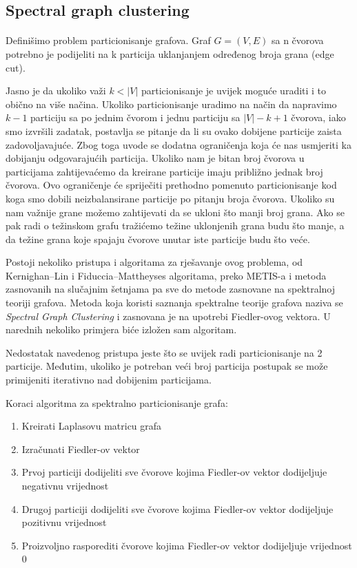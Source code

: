 \documentclass[11pt]{article}
\begin{document}
	\subsection{Spectral graph clustering}
	\paragraph{}
	Definišimo problem particionisanje grafova. Graf $G=(V,E)$ sa n čvorova potrebno je podijeliti na k particija uklanjanjem određenog broja grana (edge cut).
	
	Jasno je da ukoliko važi $k<|V|$ particionisanje je uvijek moguće uraditi i to obično na više načina. 
	Ukoliko particionisanje uradimo na način da napravimo $k-1$ particiju sa po jednim čvorom i jednu particiju sa $|V|-k+1$ čvorova,
	iako smo izvršili zadatak, postavlja se pitanje da li su ovako dobijene particije zaista zadovoljavajuće.
	Zbog toga uvode se dodatna ograničenja koja će nas usmjeriti ka dobijanju odgovarajućih particija.
	Ukoliko nam je bitan broj čvorova u particijama zahtijevaćemo da kreirane particije imaju približno jednak broj čvorova.
	Ovo ograničenje će spriječiti prethodno pomenuto particionisanje kod koga smo dobili neizbalansirane particije po pitanju broja čvorova. 
	Ukoliko su nam važnije grane možemo zahtijevati da se ukloni što manji broj grana.
	Ako se pak radi o težinskom grafu tražićemo težine uklonjenih grana budu što manje, a da težine grana koje spajaju čvorove unutar iste particije budu što veće.
	
	Postoji nekoliko pristupa i algoritama za rješavanje ovog problema, od Kernighan–Lin i Fiduccia–Mattheyses algoritama, preko METIS-a i metoda zasnovanih na slučajnim šetnjama pa sve do metode zasnovane na spektralnoj teoriji grafova. 
	Metoda koja koristi saznanja spektralne teorije grafova naziva se \emph{Spectral Graph Clustering} i zasnovana je na upotrebi Fiedler-ovog vektora. U narednih nekoliko primjera biće izložen sam algoritam.
	
	Nedostatak navedenog pristupa jeste što se uvijek radi particionisanje na 2 particije. Međutim, ukoliko je potreban veći broj particija postupak se može primijeniti iterativno nad dobijenim particijama.

	Koraci algoritma za spektralno particionisanje grafa:
		\begin{enumerate}
			\item Kreirati Laplasovu matricu grafa
			\item Izračunati Fiedler-ov vektor
			\item Prvoj particiji dodijeliti sve čvorove kojima Fiedler-ov vektor dodijeljuje negativnu vrijednost  
			\item Drugoj particiji dodijeliti sve čvorove kojima Fiedler-ov vektor dodijeljuje pozitivnu vrijednost  
			\item Proizvoljno rasporediti čvorove kojima Fiedler-ov vektor dodijeljuje vrijednost 0  
		\end{enumerate}
\end{document}
